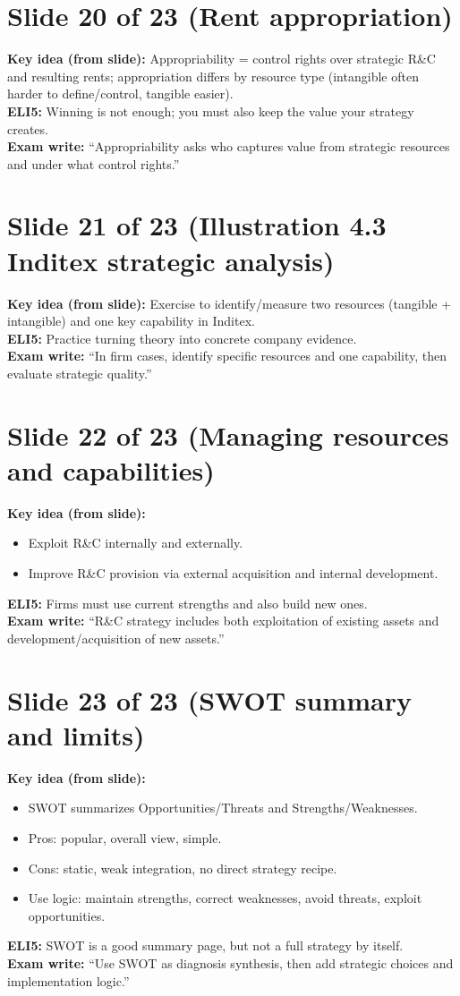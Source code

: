 \documentclass[11pt,a4paper]{article}
\begin{document}
\section*{Slide 20 of 23 (Rent appropriation)}
\textbf{Key idea (from slide):} Appropriability = control rights over strategic R\&C and resulting rents; appropriation differs by resource type (intangible often harder to define/control, tangible easier).\\
\textbf{ELI5:} Winning is not enough; you must also keep the value your strategy creates.\\
\textbf{Exam write:} ``Appropriability asks who captures value from strategic resources and under what control rights.''

\section*{Slide 21 of 23 (Illustration 4.3 Inditex strategic analysis)}
\textbf{Key idea (from slide):} Exercise to identify/measure two resources (tangible + intangible) and one key capability in Inditex.\\
\textbf{ELI5:} Practice turning theory into concrete company evidence.\\
\textbf{Exam write:} ``In firm cases, identify specific resources and one capability, then evaluate strategic quality.''

\section*{Slide 22 of 23 (Managing resources and capabilities)}
\textbf{Key idea (from slide):}
\begin{itemize}
  \item Exploit R\&C internally and externally.
  \item Improve R\&C provision via external acquisition and internal development.
\end{itemize}
\textbf{ELI5:} Firms must use current strengths and also build new ones.\\
\textbf{Exam write:} ``R\&C strategy includes both exploitation of existing assets and development/acquisition of new assets.''

\section*{Slide 23 of 23 (SWOT summary and limits)}
\textbf{Key idea (from slide):}
\begin{itemize}
  \item SWOT summarizes Opportunities/Threats and Strengths/Weaknesses.
  \item Pros: popular, overall view, simple.
  \item Cons: static, weak integration, no direct strategy recipe.
  \item Use logic: maintain strengths, correct weaknesses, avoid threats, exploit opportunities.
\end{itemize}
\textbf{ELI5:} SWOT is a good summary page, but not a full strategy by itself.\\
\textbf{Exam write:} ``Use SWOT as diagnosis synthesis, then add strategic choices and implementation logic.''
\end{document}
